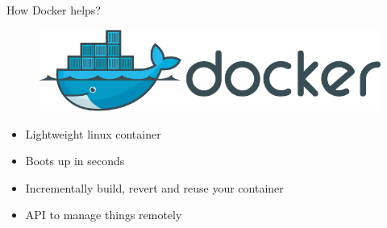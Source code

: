 \documentclass{beamer}
\begin{document}
\begin{frame}{How Docker helps?}
\begin{figure}[htp]
\centering
\includegraphics[scale=0.30]{docker_logo.png}
\label{}
\end{figure}
\begin{itemize}
  \item Lightweight linux container
  \item Boots up in seconds
  \item Incrementally build, revert and reuse your container
  \item API to manage things remotely
\end{itemize}
\end{frame}
\end{document}
